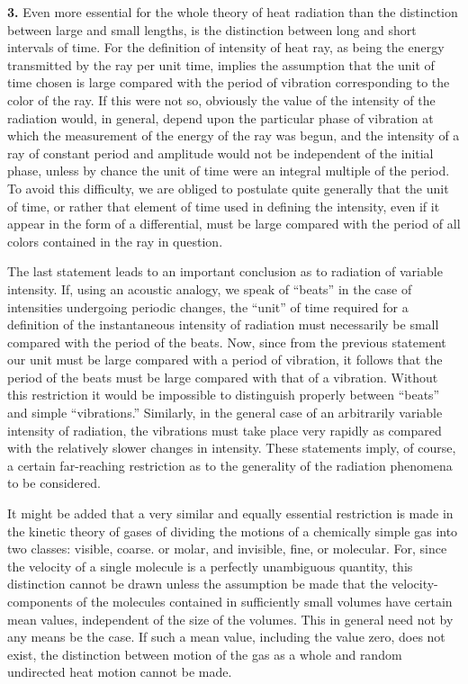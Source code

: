 \documentclass[12pt,oneside]{book}
\begin{document}
\textbf{3.} Even more essential for the whole theory of heat radiation than the distinction between large and small lengths, is the distinction between long and short intervals of time. For the definition of intensity of heat ray, as being the energy transmitted by the ray per unit time, implies the assumption that the unit of time chosen is large compared with the period of vibration corresponding to the color of the ray. If this were not so, obviously the value of the intensity of the radiation would, in general, depend upon the particular phase of vibration at which the measurement of the energy of the ray was begun, and the intensity of a ray of constant period and amplitude would not be independent of the initial phase, unless by chance the unit of time were an integral multiple of the period. To avoid this difficulty, we are obliged to postulate quite generally that the unit of time, or rather that element of time used in defining the intensity, even if it appear in the form of a differential, must be large compared with the period of all colors contained in the ray in question. \par

The last statement leads to an important conclusion as to radiation of variable intensity. If, using an acoustic analogy, we speak of ``beats'' in the case of intensities undergoing periodic changes, the ``unit'' of time required for a definition of the instantaneous intensity of radiation must necessarily be small compared with the period of the beats. Now, since from the previous statement our unit must be large compared with a period of vibration, it follows that the period of the beats must be large compared with that of a vibration. Without this restriction it would be impossible to distinguish properly between ``beats'' and simple ``vibrations.'' Similarly, in the general case of an arbitrarily variable intensity of radiation, the vibrations must take place very rapidly as compared with the relatively slower changes in intensity. These statements imply, of course, a certain far-reaching restriction as to the generality of the radiation phenomena to be considered. \par

It might be added that a very similar and equally essential restriction is made in the kinetic theory of gases of dividing the motions of a chemically simple gas into two classes: visible, coarse. or molar, and invisible, fine, or molecular. For, since the velocity of a single molecule is a perfectly unambiguous quantity, this distinction cannot be drawn unless the assumption be made that the velocity-components of the molecules contained in sufficiently small volumes have certain mean values, independent of the size of the volumes. This in general need not by any means be the case. If such a mean value, including the value zero, does not exist, the distinction between motion of the gas as a whole and random undirected heat motion cannot be made. \par
\end{document}
